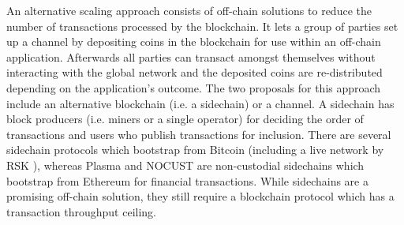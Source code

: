 \documentclass{llncs}
\begin{document}
An alternative scaling approach consists of off-chain solutions to reduce the number of transactions processed by the blockchain.
It lets a group of parties set up a channel by depositing coins in the blockchain for use within an off-chain application.
Afterwards all parties can transact amongst themselves without interacting with the global network and the deposited coins are re-distributed depending on the application's outcome. 
The two proposals for this approach include an alternative blockchain (i.e. a sidechain) or a channel. 
A sidechain has block producers (i.e. miners or a single operator) for deciding the order of transactions and users who publish transactions for inclusion. 
There are several sidechain protocols \cite{back2014enabling,dilley2016strong} which bootstrap from Bitcoin (including a live network by RSK \cite{sidechainrsk}), whereas Plasma\cite{poon2017plasma} and NOCUST\cite{khalilnocust} are non-custodial sidechains which bootstrap from Ethereum for financial transactions.
While sidechains are a promising off-chain solution, they still require a blockchain protocol which has a transaction throughput ceiling.
\end{document}

